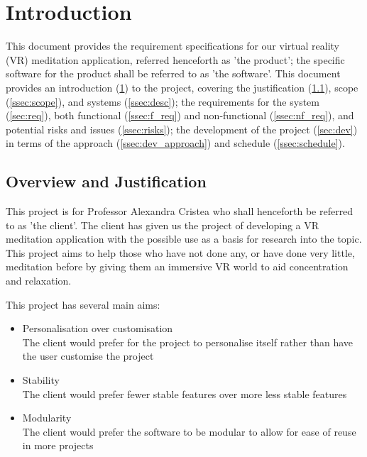 \documentclass[coverpage]{../custom}
\begin{document}
\maketitle
{}
\tableofcontents\newpage
{}

\section{Introduction}
\label{sec:intro}

This document provides the requirement specifications for our virtual reality (VR) meditation application, referred henceforth as 'the product'; the specific software for the product shall be referred to as 'the software'. This document provides an introduction (\cref{sec:intro}) to the project, covering the justification (\cref{ssec:just}), scope (\cref{ssec:scope}), and systems (\cref{ssec:desc}); the requirements for the system (\cref{sec:req}), both functional (\cref{ssec:f_req}) and non-functional (\cref{ssec:nf_req}), and potential risks and issues (\cref{ssec:risks}); the development of the project (\cref{sec:dev}) in terms of the approach (\cref{ssec:dev_approach}) and schedule (\cref{ssec:schedule}).

\subsection{Overview and Justification}
\label{ssec:just}

This project is for Professor Alexandra Cristea who shall henceforth be referred to as 'the client'. The client has given us the project of developing a VR meditation application with the possible use as a basis for research into the topic. This project aims to help those who have not done any, or have done very little, meditation before by giving them an immersive VR world to aid concentration and relaxation.

This project has several main aims:
\begin{itemize}
	\item Personalisation over customisation\\
	The client would prefer for the project to personalise itself rather than have the user customise the project
	\item Stability\\
	The client would prefer fewer stable features over more less stable features
	\item Modularity\\
	The client would prefer the software to be modular to allow for ease of reuse in more projects
\end{itemize}
\end{document}
